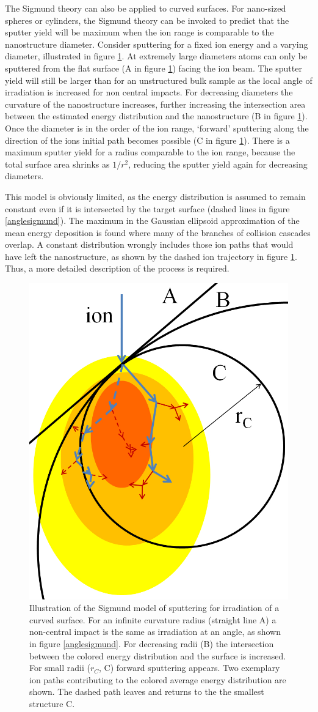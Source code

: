 The Sigmund theory can also be applied to curved surfaces. For nano-sized spheres or cylinders, the Sigmund theory can be invoked to predict that the sputter yield will be maximum when the ion range is comparable to the nanostructure diameter. Consider sputtering for a fixed ion energy and a varying diameter, illustrated in figure \ref{radiussigmund}. At extremely large diameters atoms can only be sputtered from the flat surface (A in figure \ref{radiussigmund}) facing the ion beam. The sputter yield will still be larger than for an unstructured bulk sample as the local angle of irradiation is increased for non central impacts. For decreasing diameters the curvature of the nanostructure increases, further increasing the intersection area between the estimated energy distribution and the nanostructure (B in figure \ref{radiussigmund}). Once the diameter is in the order of the ion range, `forward' sputtering along the direction of the ions initial path becomes possible (C in figure \ref{radiussigmund}). There is a maximum sputter yield for a radius comparable to the ion range, because the total surface area shrinks as $1/r^2$, reducing the sputter yield again for decreasing diameters. 

This model is obviously limited, as the energy distribution is assumed to remain constant even if it is intersected by the target surface (dashed lines in figure \ref{anglesigmund}). The maximum in the Gaussian ellipsoid approximation of the mean energy deposition is found where many of the branches of collision cascades overlap. A constant distribution wrongly includes those ion paths that would have left the nanostructure, as shown by the dashed ion trajectory in figure \ref{radiussigmund}. Thus, a more detailed description of the process is required.

\begin{figure}
	\centering
		\includegraphics[width=.4\textwidth]{images/radiussigmund.jpg}
	\caption{Illustration of the Sigmund model of sputtering for irradiation of a curved surface. For an infinite curvature radius (straight line A) a non-central impact is the same as irradiation at an angle, as shown in figure \ref{anglesigmund}. For decreasing radii (B) the intersection between the colored energy distribution and the surface is increased. For small radii ($r_C$, C) forward sputtering appears. Two exemplary ion paths contributing to the colored average energy distribution are shown. The dashed path leaves and returns to the the smallest structure C.}
	\label{radiussigmund}
\end{figure} 


